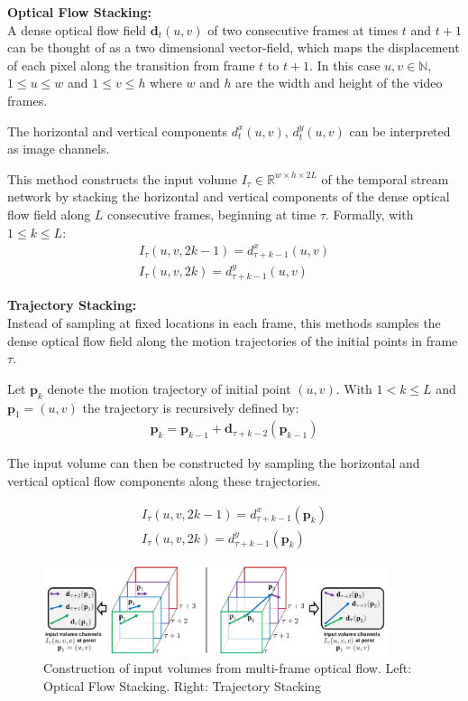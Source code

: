 \textbf{Optical Flow Stacking:} \\
A dense optical flow field $\mathbf{d}_t(u,v)$ of two consecutive frames at times $t$ and $t+1$ can be thought of as a two dimensional vector-field, which maps the displacement of each pixel along the transition from frame $t$ to $t+1$. In this case $u,v \in \mathbb{N}$, $1 \leq u \leq w$ and $1 \leq v \leq h$ where $w$ and $h$ are the width and height of the video frames.

The horizontal and vertical components $d_t^x(u,v)$, $d_t^y(u,v)$ can be interpreted as image channels.

This method constructs the input volume $I_\tau \in \mathbb{R}^{w \times h \times 2L}$ of the temporal stream network by stacking the horizontal and vertical components of the dense optical flow field along $L$ consecutive frames, beginning at time $\tau$. Formally, with $1 \leq k \leq L$:
\begin{align*}
    I_\tau(u,v,2k-1) = d_{\tau + k - 1}^x(u,v) \\
    I_\tau(u,v,2k) = d_{\tau + k - 1}^{y}(u,v)
\end{align*}

\textbf{Trajectory Stacking:} \\
Instead of sampling at fixed locations in each frame, this methods samples the dense optical flow field along the motion trajectories of the initial points in frame $\tau$.

Let $\mathbf{p}_k$ denote the motion trajectory of initial point $(u,v)$. With $1 < k \leq L$ and \mbox{$\mathbf{p}_1 = (u,v)$} the trajectory is recursively defined by:
\begin{align*}
    \mathbf{p}_k = \mathbf{p}_{k-1} + \mathbf{d}_{\tau + k - 2}(\mathbf{p}_{k-1})
\end{align*}

The input volume can then be constructed by sampling the horizontal and vertical optical flow components along these trajectories.

\begin{align*}
    I_\tau(u,v,2k-1) = d_{\tau + k - 1}^x(\mathbf{p}_{k}) \\
    I_\tau(u,v,2k) = d_{\tau + k - 1}^y(\mathbf{p}_{k})
\end{align*}

\begin{figure}[H]
    \centering
    \includegraphics[width=0.9\textwidth]{img_deep/trajectory_stacking}
    \caption{Construction of input volumes from multi-frame optical flow. Left: Optical Flow Stacking. Right: Trajectory Stacking \cite{simonyan_two-stream_2014}}
    \label{fig:trajectory_stacking}
\end{figure}

